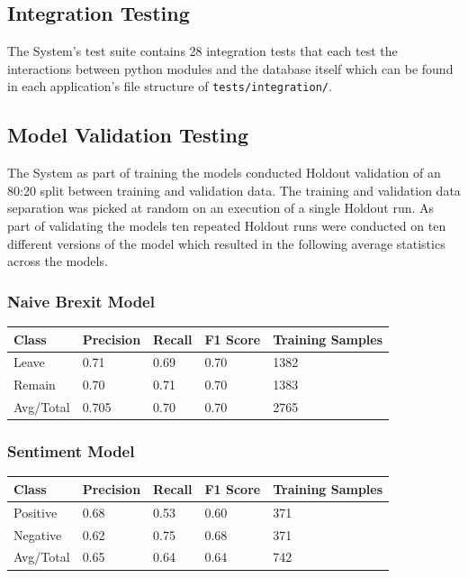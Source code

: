 \documentclass[11pt]{report}
\begin{document}
\enlargethispage{\baselineskip}
\subsection*{Integration Testing}
The System's test suite contains 28 integration tests that each test the interactions between python modules and the database itself which can be found in each application's file structure of \texttt{tests/integration/}.

\subsection*{Model Validation Testing}
The System as part of training the models conducted Holdout validation of an 80:20 split between training and validation data. The training and validation data separation was picked at random on an execution of a single Holdout run. As part of validating the models ten repeated Holdout runs were conducted on ten different versions of the model which resulted in the following average statistics across the models. 
\subsubsection*{Naive Brexit Model}

\begin{center}
\begin{tabular}{ |p{2cm}||p{2cm}|p{2cm}|p{2cm}|p{2cm}|}
\hline
 Class & Precision & Recall & F1 Score & Training Samples\\
 \hline
 Leave & 0.71 & 0.69 & 0.70 & 1382\\
 \hline
 Remain & 0.70 & 0.71 & 0.70 & 1383\\
 \hline
 Avg/Total & 0.705 & 0.70 & 0.70 & 2765\\
 \hline
\end{tabular}
\label{table:naive-results}
\end{center}

\subsubsection*{Sentiment Model}

\begin{center}
\begin{tabular}{ |p{2cm}|p{2cm}|p{2cm}|p{2cm}|p{2cm}|}
\hline
 Class & Precision & Recall & F1 Score & Training Samples\\
 \hline
 Positive & 0.68 & 0.53 & 0.60 & 371\\
 \hline
 Negative & 0.62 & 0.75 & 0.68 & 371\\
 \hline
 Avg/Total & 0.65 & 0.64 & 0.64 & 742\\
 \hline
\end{tabular}
\end{center}
\end{document}
